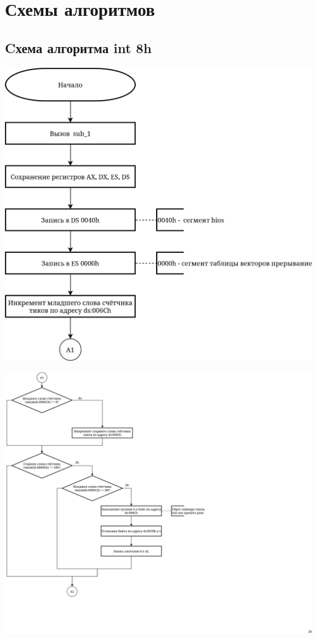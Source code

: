 \documentclass[a4paper,14pt]{article}
\begin{document}
	\section{Схемы алгоритмов}
	\subsection{Cхема алгоритма int 8h}
	\begin{center}
		\includegraphics[height=0.5\textheight]{img/main1}

	\end{center}
	\pagebreak
	\begin{center}
	\includegraphics[height=0.85\textheight]{img/main2}
	\end{center}
\end{document}
